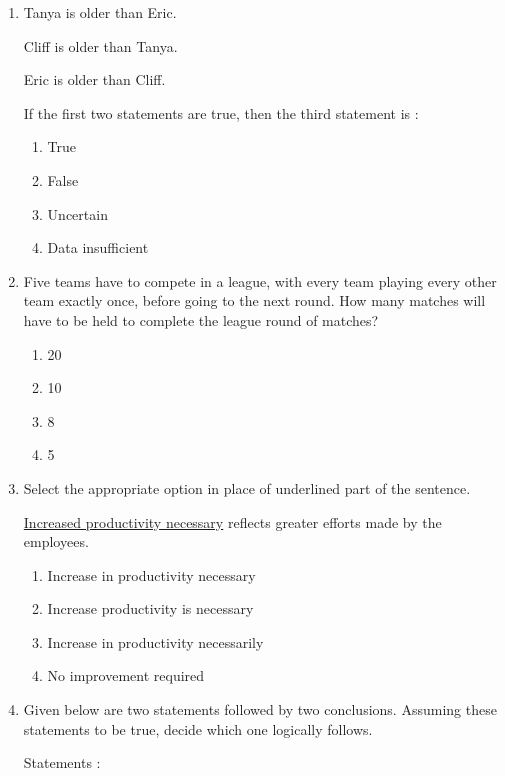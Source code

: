 \documentclass[journal]{IEEEtran}
\begin{document}
\begin{enumerate}
\item Tanya is older than Eric.

Cliff is older than Tanya.

Eric is older than Cliff.

If the first two statements are true, then the third statement is :
\begin{multicols}{2}
\begin{enumerate}
\item True
\item False
\item Uncertain
\item Data insufficient
\end{enumerate}
\end{multicols}


\item Five teams have to compete in a league, with every team playing every other team exactly once, before going to the next round. How many matches will have to be held to complete the league round of matches?
\begin{multicols}{2}
\begin{enumerate}
\item 20
\item 10
\item 8
\item 5
\end{enumerate}
\end{multicols}


\item Select the appropriate option in place of underlined part of the sentence.

\underline{Increased productivity necessary} reflects greater efforts made by the employees.
\begin{multicols}{2}
\begin{enumerate}
\item Increase in productivity necessary
\item Increase productivity is necessary
\item Increase in productivity necessarily
\item No improvement required
\end{enumerate}
\end{multicols}


\item Given below are two statements followed by two conclusions. Assuming these statements to be true, decide which one logically follows.

Statements :


\end{enumerate}
\end{document}
